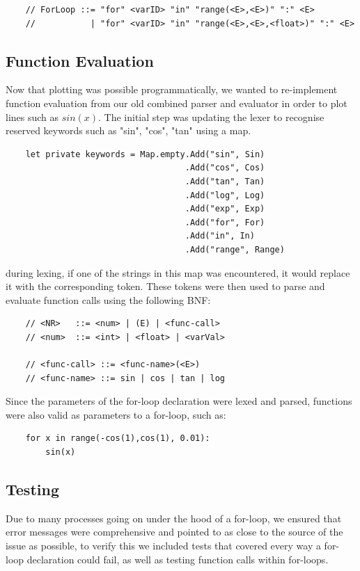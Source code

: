 \documentclass[a4paper, oneside, 11pt]{report}
\begin{document}
\begin{verbatim}
    // ForLoop ::= "for" <varID> "in" "range(<E>,<E>)" ":" <E>
    //           | "for" <varID> "in" "range(<E>,<E>,<float>)" ":" <E>
\end{verbatim}

\subsection{Function Evaluation}

Now that plotting was possible programmatically, we wanted to re-implement function evaluation from our old combined parser and evaluator in order to plot lines such as $sin(x)$. The initial step was updating the lexer to recognise reserved keywords such as "sin", "cos", "tan" using a map.

\begin{verbatim}
    let private keywords = Map.empty.Add("sin", Sin)
                                    .Add("cos", Cos)
                                    .Add("tan", Tan)
                                    .Add("log", Log)
                                    .Add("exp", Exp)
                                    .Add("for", For)
                                    .Add("in", In)
                                    .Add("range", Range)
\end{verbatim}

during lexing, if one of the strings in this map was encountered, it would replace it with the corresponding token. These tokens were then used to parse and evaluate function calls using the following BNF:

\begin{verbatim}
    // <NR>   ::= <num> | (E) | <func-call>
    // <num>  ::= <int> | <float> | <varVal>

    // <func-call> ::= <func-name>(<E>)
    // <func-name> ::= sin | cos | tan | log
\end{verbatim}

Since the parameters of the for-loop declaration were lexed and parsed, functions were also valid as parameters to a for-loop, such as:

\begin{verbatim}
    for x in range(-cos(1),cos(1), 0.01): 
        sin(x)
\end{verbatim}

\subsection{Testing}
Due to many processes going on under the hood of a for-loop, we ensured that error messages were comprehensive and pointed to as close to the source of the issue as possible, to verify this we included tests that covered every way a for-loop declaration could fail, as well as testing function calls within for-loops.
\end{document}
